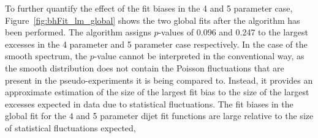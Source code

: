 To further quantify the effect of the fit biases in the 4 and 5 parameter case,
Figure~\ref{fig:bhFit_lm_global} shows the two global fits after the \bh{} algorithm has been performed.
The \bh{} algorithm assigns \mbox{$p$-values} of 0.096 and 0.247 to the largest excesses in the 4 parameter and 5 parameter case respectively.
In the case of the smooth spectrum, the \bh{} \mbox{$p$-value} cannot be interpreted in the conventional way,
as the smooth distribution does not contain the Poisson fluctuations that are present in the pseudo-experiments it is being compared to.
Instead, it provides an approximate estimation of the size of the largest fit bias to the size of the largest excesses expected in data due to statistical fluctuations.
The fit biases in the global fit for the 4 and 5 parameter dijet fit functions are large relative to the size of statistical fluctuations expected,

